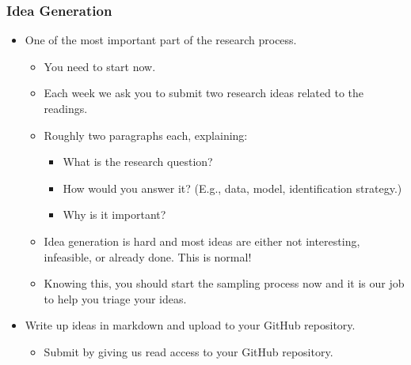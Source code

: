 \documentclass[english,xcolor=svgnames]{beamer}
\begin{document}
\begin{frame}
	\frametitle[alignment=center]{Idea Generation}
	\begin{itemize}
		\item One of the most important part of the research process.
		\begin{itemize}
			\item You need to start now.
			\item Each week we ask you to submit two research ideas related to the readings.
			\item Roughly two paragraphs each, explaining:
			\begin{itemize}
				\item What is the research question?
				\item How would you answer it? (E.g., data, model, identification strategy.)
				\item Why is it important?
			\end{itemize}
			\item Idea generation is hard and most ideas are either not interesting, infeasible, or already done. This is normal!
			\item Knowing this, you should start the sampling process now and it is our job to help you triage your ideas.
		\end{itemize}
		\item Write up ideas in markdown and upload to your GitHub repository.
		\begin{itemize}
			\item Submit by giving us read access to your GitHub repository.
		\end{itemize}
	\end{itemize}
	\end{frame}
\end{document}
